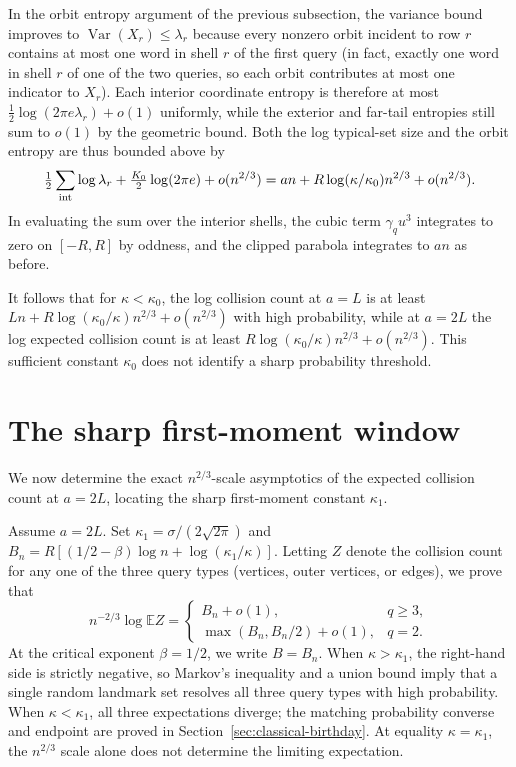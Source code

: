 In the orbit entropy argument of the previous subsection, the variance bound improves to $\operatorname{Var}(X_r)\le\lambda_r$ because every nonzero orbit incident to row $r$ contains at most one word in shell $r$ of the first query (in fact, exactly one word in shell $r$ of one of the two queries, so each orbit contributes at most one indicator to $X_r$). Each interior coordinate entropy is therefore at most $\tfrac12\log(2\pi e\lambda_r)+o(1)$ uniformly, while the exterior and far-tail entropies still sum to $o(1)$ by the geometric bound. Both the log typical-set size and the orbit entropy are thus bounded above by
\[
 \tfrac12\sum_{\rm int}\log\lambda_r+\tfrac{K_0}{2}\log(2\pi e)+o(n^{2/3})
 =an+R\log(\kappa/\kappa_0)n^{2/3}+o(n^{2/3}).
\]
In evaluating the sum over the interior shells, the cubic term $\gamma_q u^3$ integrates to zero on $[-R,R]$ by oddness, and the clipped parabola integrates to $an$ as before.

It follows that for $\kappa<\kappa_0$, the log collision count at $a=L$ is at least $Ln+R\log(\kappa_0/\kappa)n^{2/3}+o(n^{2/3})$ with high probability, while at $a=2L$ the log expected collision count is at least $R\log(\kappa_0/\kappa)n^{2/3}+o(n^{2/3})$. This sufficient constant $\kappa_0$ does not identify a sharp probability threshold.

\section{The sharp first-moment window}
We now determine the exact $n^{2/3}$-scale asymptotics of the expected collision count at $a=2L$, locating the sharp first-moment constant $\kappa_1$.

Assume $a=2L$. Set $\kappa_1=\sigma/(2\sqrt{2\pi})$ and $B_n=R[(1/2-\beta)\log n+\log(\kappa_1/\kappa)]$. Letting $Z$ denote the collision count for any one of the three query types (vertices, outer vertices, or edges), we prove that
\[
 n^{-2/3}\log\mathbb E Z=
 \begin{cases}B_n+o(1),&q\ge3,\\
 \max(B_n,B_n/2)+o(1),&q=2.
 \end{cases}
\]
At the critical exponent $\beta=1/2$, we write $B=B_n$. When $\kappa>\kappa_1$, the right-hand side is strictly negative, so Markov's inequality and a union bound imply that a single random landmark set resolves all three query types with high probability. When $\kappa<\kappa_1$, all three expectations diverge; the matching probability converse and endpoint are proved in Section~\ref{sec:classical-birthday}. At equality $\kappa=\kappa_1$, the $n^{2/3}$ scale alone does not determine the limiting expectation.

